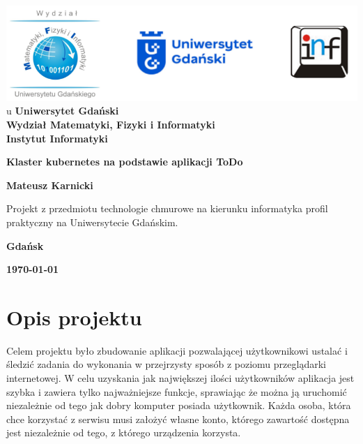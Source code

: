 \documentclass[12pt,a4paper]{article}
\newcommand{\hmwkTitle}{Klaster kubernetes na podstawie aplikacji ToDo} %
\newcommand{\hmwkDueDate}{\today} %
\newcommand{\hmwkAuthorName}{Mateusz Karnicki} %
\begin{document}
\begin{titlepage}
    \vfill
	\begin{center}
	\hspace*{-1cm}
	\vspace*{0.5cm}
    \includegraphics[scale=0.55]{imagens/loga.png}\\u	\textbf{Uniwersytet Gdański \\ [0.05cm]Wydział Matematyki, Fizyki i Informatyki \\ [0.05cm] Instytut Informatyki}

	\vspace{0.6cm}
	\vspace{4cm}
	{\huge \textbf{\hmwkTitle}}\vspace{8mm}
	
	{\large \textbf{\hmwkAuthorName}}\\[3cm]
	
		\hspace{.45\textwidth} %
	   \begin{minipage}{.5\textwidth}
	   Projekt z przedmiotu technologie chmurowe na kierunku informatyka profil praktyczny na Uniwersytecie Gdańskim.\\[0.1cm]
	  \end{minipage}
	  \vfill
	
	\textbf{Gdańsk}
	
	\textbf{\hmwkDueDate}
	\end{center}
	
\end{titlepage}

\newpage
\setcounter{secnumdepth}{5}
\tableofcontents
\newpage

\section{Opis projektu}
\label{sec:Project}

Celem projektu było zbudowanie aplikacji pozwalającej użytkownikowi ustalać i śledzić zadania do wykonania w przejrzysty sposób z poziomu przeglądarki internetowej. W celu uzyskania jak największej ilości użytkowników aplikacja jest szybka i zawiera tylko najważniejsze funkcje, sprawiając że można ją uruchomić niezależnie od tego jak dobry komputer posiada użytkownik.
\newline
\newline
Każda osoba, która chce korzystać z serwisu musi założyć własne konto, którego zawartość dostępna jest niezależnie od tego, z którego urządzenia korzysta.
\end{document}

